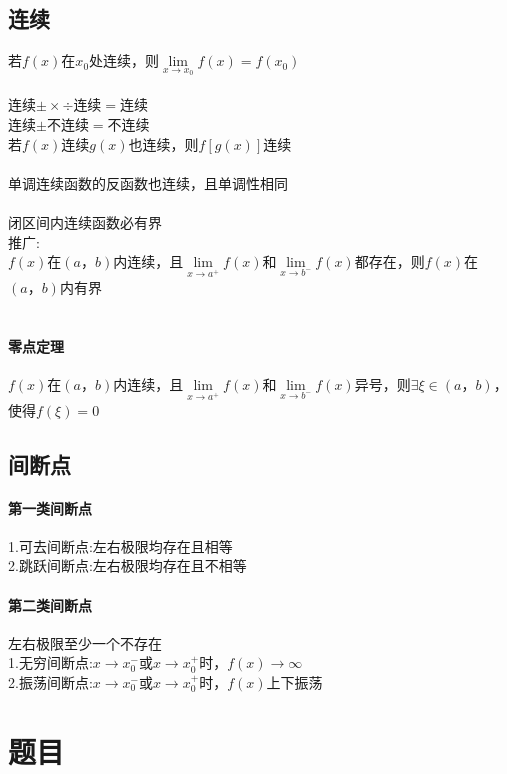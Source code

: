 \documentclass{article}
\begin{document}
\begin{flushleft}
	\subsection{连续}
	
	若$f(x)$在$x_0$处连续，则$\lim\limits_{x\to x_0} f(x)=f(x_0)$\\
	~\\
	连续$\pm\times\div$连续$=$连续\\
	连续$\pm$不连续$=$不连续\\
	若$f(x)$连续$g(x)$也连续，则$f[g(x)]$连续\\
	~\\
	单调连续函数的反函数也连续，且单调性相同\\
	~\\
	闭区间内连续函数必有界\\
	推广:\\
	$f(x)$在$(a，b)$内连续，且$\lim\limits_{x\to a^+} f(x)$和$\lim\limits_{x\to b^-} f(x)$都存在，则$f(x)$在$(a，b)$内有界\\
	~\\
	\paragraph{零点定理}
	$f(x)$在$(a，b)$内连续，且$\lim\limits_{x\to a^+} f(x)$和$\lim\limits_{x\to b^-} f(x)$异号，则$\exists \xi \in (a，b)$，使得$f(\xi)=0$\\
	
	\subsection{间断点}
	
	\paragraph{第一类间断点}
	1.可去间断点:左右极限均存在且相等\\
	2.跳跃间断点:左右极限均存在且不相等\\
	\paragraph{第二类间断点}
	左右极限至少一个不存在\\
	1.无穷间断点:$x\to x_0^-$或$x\to x_0^+$时，$f(x)\to \infty$\\
	2.振荡间断点:$x\to x_0^-$或$x\to x_0^+$时，$f(x)$上下振荡\\

	\section{题目}
	

\end{flushleft}
\end{document}
